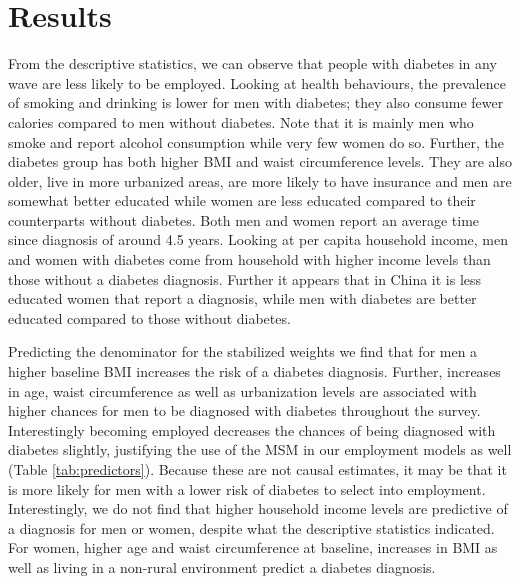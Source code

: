 \section{\label{sec:Results5}Results}

From the descriptive statistics, we can observe that people with diabetes in any wave are less likely to be employed. Looking at health behaviours, the prevalence of smoking and drinking is lower for men with diabetes; they also consume fewer calories compared to men without diabetes.  Note that it is mainly men who smoke and report alcohol consumption while very few women do so. Further, the diabetes group has both higher \ac{BMI} and waist circumference levels. They are also older, live in more urbanized areas, are more likely to have insurance and men are somewhat better educated while women are less educated compared to their counterparts without diabetes. Both men and women report an average time since diagnosis of around 4.5 years. Looking at per capita household income, men and women with diabetes come from household with higher income levels than those without a diabetes diagnosis. Further it appears that in China it is less educated women that report a diagnosis, while men with diabetes are better educated compared to those without diabetes.

Predicting the denominator for the stabilized weights we find that for men a higher baseline \ac{BMI} increases the risk of a diabetes diagnosis. Further, increases in age, waist circumference as well as urbanization levels are associated with higher chances for men to be diagnosed with diabetes throughout the survey. Interestingly becoming employed decreases the chances of being diagnosed with diabetes slightly, justifying the use of the \ac{MSM} in our employment models as well  (Table \ref{tab:predictors}). Because these are not causal estimates, it may be that it is more likely for men with a lower risk of diabetes to select into employment. Interestingly, we do not find that higher household income levels are predictive of a diagnosis for men or women, despite what the descriptive statistics indicated. For women, higher age and waist circumference at baseline, increases in \ac{BMI} as well as living in a non-rural environment predict a diabetes diagnosis. 


